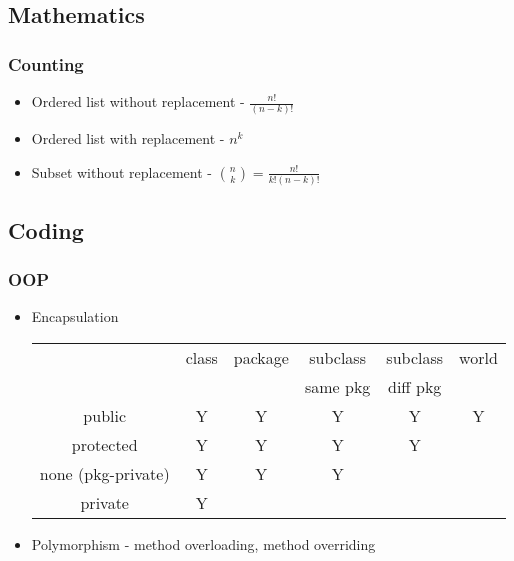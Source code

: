 \documentclass[10pt]{article}
\begin{document}
\subsection{Mathematics}
\subsubsection{Counting}
\begin{itemize}
    \itemsep0em
    \item Ordered list without replacement - $\frac{n!}{(n-k)!}$
    \item Ordered list with replacement - $n^k$
    \item Subset without replacement - $\binom{n}{k} = \frac{n!}{k!(n-k)!}$
\end{itemize}

\subsection{Coding}
\subsubsection{OOP}
\begin{itemize}
    \itemsep0em
    \item Encapsulation\\
    \begin{tabular}{|c|c|c|c|c|c|}
    \hline
         & class & package & subclass & subclass & world \\
         & & & same pkg & diff pkg &\\
         \hline
        public & Y & Y & Y & Y & Y\\
        protected & Y & Y & Y & Y & \\
        none (pkg-private) & Y & Y & Y & & \\
        private & Y & & & &\\
        \hline
    \end{tabular}
    \item Polymorphism - method overloading, method overriding
\end{itemize}
\end{document}

